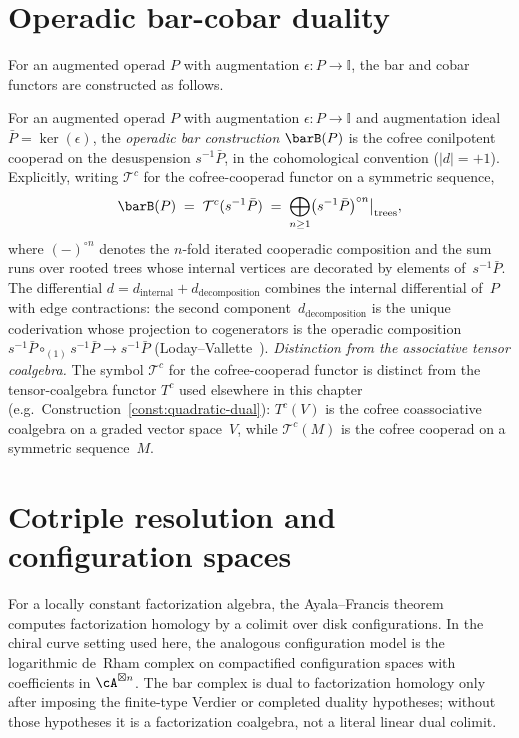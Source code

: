 \section{Operadic bar-cobar duality}

For an augmented operad $P$ with augmentation
$\epsilon\colon P \to \mathbb{I}$, the bar and cobar functors
are constructed as follows.

\begin{definition}
\label{def:operadic-bar-construction}
For an augmented operad $P$ with augmentation
$\epsilon\colon P \to \mathbb{I}$ and augmentation ideal
$\bar{P} = \ker(\epsilon)$, the \emph{operadic bar construction}
$\barB(P)$ is the cofree conilpotent cooperad on the
desuspension $s^{-1}\bar{P}$, in the cohomological convention
($|d| = +1$). Explicitly, writing $\mathcal{T}^c$ for the
cofree-cooperad functor on a symmetric sequence,
\[
\barB(P) \;=\; \mathcal{T}^c(s^{-1}\bar{P})
\;=\; \bigoplus_{n \geq 1}
\bigl(s^{-1}\bar{P}\bigr)^{\circ n}\bigl|_{\text{trees}},
\]
where $(-)^{\circ n}$ denotes the $n$-fold iterated cooperadic
composition and the sum runs over rooted trees whose internal
vertices are decorated by elements of~$s^{-1}\bar{P}$. The
differential $d = d_{\mathrm{internal}} + d_{\mathrm{decomposition}}$
combines the internal differential of~$P$ with edge contractions:
the second component~$d_{\mathrm{decomposition}}$ is the unique
coderivation whose projection to cogenerators is the operadic
composition
$s^{-1}\bar{P} \circ_{(1)} s^{-1}\bar{P} \to s^{-1}\bar{P}$
(Loday--Vallette~\cite[\S6.5]{LV12}).
\emph{Distinction from the associative tensor coalgebra.}
The symbol $\mathcal{T}^c$ for the cofree-cooperad functor is
distinct from the tensor-coalgebra functor $T^c$ used elsewhere in
this chapter (e.g.\ Construction~\ref{const:quadratic-dual}):
$T^c(V)$ is the cofree coassociative coalgebra on a graded vector
space~$V$, while $\mathcal{T}^c(M)$ is the cofree cooperad on a
symmetric sequence~$M$.
\end{definition}

\section{Cotriple resolution and configuration spaces}

\begin{remark}
For a locally constant factorization algebra, the
Ayala--Francis theorem~\cite{AF15} computes factorization
homology by a colimit over disk configurations. In the chiral
curve setting used here, the analogous configuration model is
the logarithmic de~Rham complex on compactified configuration
spaces with coefficients in $\cA^{\boxtimes n}$. The bar complex
is dual to factorization homology only after imposing the
finite-type Verdier or completed duality hypotheses; without
those hypotheses it is a factorization coalgebra, not a literal
linear dual colimit.
\end{remark}

